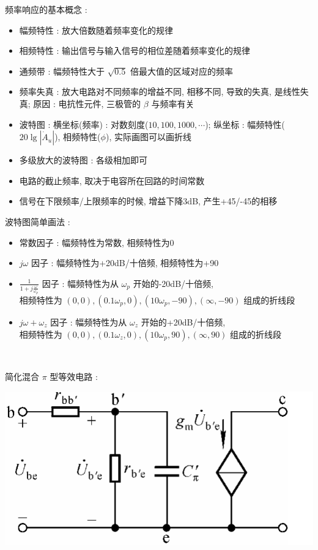 \documentclass[UTF8, 12pt]{ctexart}
\begin{document}
	\noindent
	频率响应的基本概念 :
	\begin{itemize}[leftmargin = 4em]
		\item 幅频特性 : 放大倍数随着频率变化的规律
		\item 相频特性 : 输出信号与输入信号的相位差随着频率变化的规律
		\item 通频带 : 幅频特性大于 $ \sqrt{0.5} $ 倍最大值的区域对应的频率
		\item 频率失真 : 放大电路对不同频率的增益不同, 相移不同, 导致的失真, 是线性失真; 原因 : 电抗性元件, 三极管的 $ \beta $ 与频率有关
		\item 波特图 : 横坐标(频率) : 对数刻度($ 10, 100, 1000, \cdots $); 纵坐标 : 幅频特性($ 20\lg|\dot{A}_{u}| $), 相频特性($ \phi $), 实际画图可以画折线
		\item 多级放大的波特图 : 各级相加即可
		\item 电路的截止频率, 取决于电容所在回路的时间常数
		\item 信号在下限频率/上限频率的时候, 增益下降3dB, 产生+45/-45的相移
	\end{itemize}

	波特图简单画法 :
	\begin{itemize}[leftmargin = 4em]
		\item 常数因子 : 幅频特性为常数, 相频特性为0
		\item $ j\omega $ 因子 : 幅频特性为+20dB/十倍频, 相频特性为+90
		\item $ \frac{1}{1+j\frac{\omega}{\omega_{p}}} $ 因子 : 幅频特性为从 $ \omega_{p} $ 开始的-20dB/十倍频, \\
			  相频特性为 $ (0, 0), (0.1\omega_{p}, 0), (10\omega_{p}, -90), (\infty, -90) $ 组成的折线段
		\item $ j\omega+\omega_{z} $ 因子 : 幅频特性为从 $ \omega_{z} $ 开始的+20dB/十倍频, \\
			  相频特性为 $ (0, 0), (0.1\omega_{z}, 0), (10\omega_{p}, 90), (\infty, 90) $ 组成的折线段
	\end{itemize}

	~

	\noindent
	简化混合 $ \pi $ 型等效电路 :

	\includegraphics[scale = 0.4]{05/混合pi型等效电路电路图.png}
\end{document}
